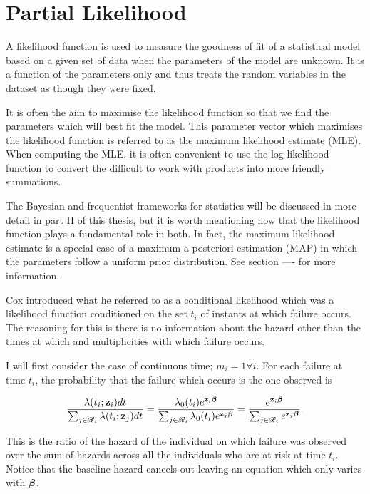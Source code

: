 \newpage
\section{Partial Likelihood}\label{partial-likelihood}

A likelihood function is used to measure the goodness of fit of a statistical model based on a given set of data when the parameters of the model are unknown. It is a function of the parameters only and thus treats the random variables in the dataset as though they were fixed.

It is often the aim to maximise the likelihood function so that we find the parameters which will best fit the model. This parameter vector which maximises the likelihood function is referred to as the maximum likelihood estimate (MLE). When computing the MLE, it is often convenient to use the log-likelihood function to convert the difficult to work with products into more friendly summations.

The Bayesian and frequentist frameworks for statistics will be discussed in more detail in part II of this thesis, but it is worth mentioning now that the likelihood function plays a fundamental role in both. In fact, the maximum likelihood estimate is a special case of a maximum a posteriori estimation (MAP) in which the parameters follow a uniform prior distribution. See section ---- for more information.

Cox  introduced what he referred to as a conditional likelihood which was a likelihood function conditioned on the set ${t_i}$ of instants at which failure occurs. The reasoning for this is there is no information about the hazard other than the times at which and multiplicities with which failure occurs. 

I will first consider the case of continuous time; $m_i=1\forall i$. For each failure at time $t_i$, the probability that the failure which occurs is the one observed is 

\begin{equation}
    \frac{\lambda(t_i; \textbf{z}_i)dt}{\sum_{j\in\mathscr{R}_i}\lambda(t_i; \textbf{z}_{j})dt} = 
    \frac{\lambda_0(t_i)e^{\textbf{z}_i\boldsymbol{\beta}}}{\sum_{j\in\mathscr{R}_i}\lambda_0(t_i)e^{\textbf{z}_j\boldsymbol{\beta}}} = \frac{e^{\textbf{z}_i\boldsymbol{\beta}}}{\sum_{j\in\mathscr{R}_i}e^{\textbf{z}_j\boldsymbol{\beta}}}.
\end{equation}

This is the ratio of the hazard of the individual on which failure was observed over the sum of hazards across all the individuals who are at risk at time $t_i$. Notice that the baseline hazard cancels out leaving an equation which only varies with $\boldsymbol{\beta}$.

